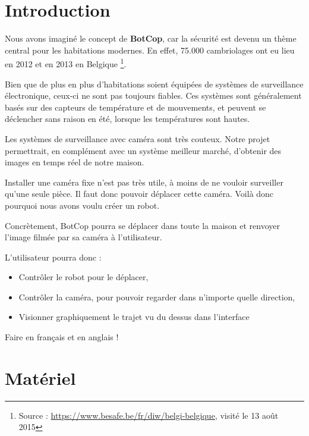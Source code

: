 \documentclass[12pt,a4paper]{report}
\begin{document}
\umonsCoverPage

\tableofcontents

\chapter{Introduction}

Nous avons imaginé le concept de \textbf{BotCop}, car la sécurité est devenu un thème central pour les habitations modernes. En effet, 75.000 cambriolages ont eu lieu en 2012 et en 2013 en Belgique \footnote{Source : \url{https://www.besafe.be/fr/diw/belgi-belgique}, visité le 13 août 2015}.

Bien que de plus en plus d'habitations soient équipées de systèmes de surveillance électronique, ceux-ci ne sont pas toujours fiables. Ces systèmes sont généralement basés sur des capteurs de température et de mouvements, et peuvent se déclencher sans raison en été, lorsque les températures sont hautes.

Les systèmes de surveillance avec caméra sont très couteux. Notre projet permettrait, en complément avec un système meilleur marché, d'obtenir des images en temps réel de notre maison.

Installer une caméra fixe n'est pas très utile, à moins de ne vouloir surveiller qu'une seule pièce. Il faut donc pouvoir déplacer cette caméra. Voilà donc pourquoi nous avons voulu créer un robot.

Concrètement, BotCop pourra se déplacer dans toute la maison et renvoyer l'image filmée par sa caméra à l'utilisateur.

L'utilisateur pourra donc :

\bigbreak
\begin{itemize}
\item Contrôler le robot pour le déplacer,
\item Contrôler la caméra, pour pouvoir regarder dans n'importe quelle direction,
\item Visionner graphiquement le trajet vu du dessus dans l'interface
\end{itemize}



Faire en français et en anglais !


\chapter{Matériel} \label{Matériel}
\end{document}
